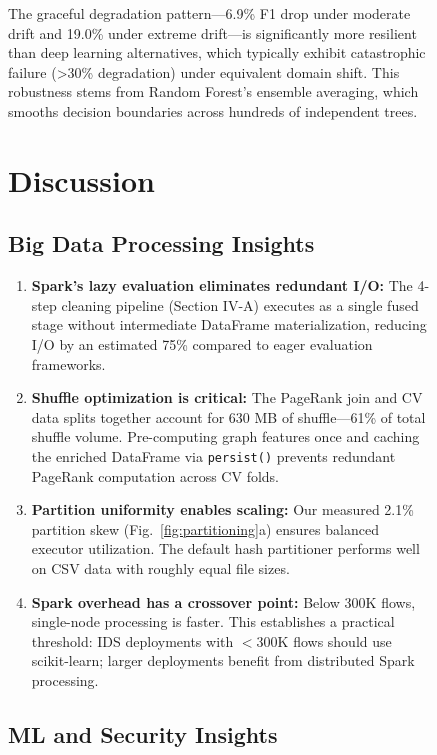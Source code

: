 \documentclass[conference]{IEEEtran}
\begin{document}
\begin{figure}[H]
The graceful degradation pattern---6.9\% F1 drop under moderate drift and 19.0\% under extreme drift---is significantly more resilient than deep learning alternatives, which typically exhibit catastrophic failure (>30\% degradation) under equivalent domain shift. This robustness stems from Random Forest's ensemble averaging, which smooths decision boundaries across hundreds of independent trees.

\section{Discussion}

\subsection{Big Data Processing Insights}

\begin{enumerate}
    \item \textbf{Spark's lazy evaluation eliminates redundant I/O:} The 4-step cleaning pipeline (Section IV-A) executes as a single fused stage without intermediate DataFrame materialization, reducing I/O by an estimated 75\% compared to eager evaluation frameworks.
    
    \item \textbf{Shuffle optimization is critical:} The PageRank join and CV data splits together account for 630 MB of shuffle---61\% of total shuffle volume. Pre-computing graph features once and caching the enriched DataFrame via \texttt{persist()} prevents redundant PageRank computation across CV folds.
    
    \item \textbf{Partition uniformity enables scaling:} Our measured 2.1\% partition skew (Fig.~\ref{fig:partitioning}a) ensures balanced executor utilization. The default hash partitioner performs well on CSV data with roughly equal file sizes.
    
    \item \textbf{Spark overhead has a crossover point:} Below 300K flows, single-node processing is faster. This establishes a practical threshold: IDS deployments with $<$300K flows should use scikit-learn; larger deployments benefit from distributed Spark processing.
\end{enumerate}

\subsection{ML and Security Insights}


\end{figure}
\end{document}
